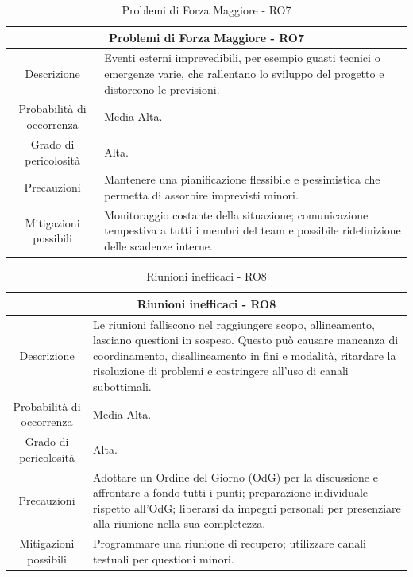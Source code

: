 \documentclass[12pt, a4paper]{article}
\begin{document}
\begin{table}[H]
    \centering
    \renewcommand{\arraystretch}{1.3}
    \begin{tabularx}{\textwidth}{|c|X|}
        \hline
        \multicolumn{2}{|c|}{\textbf{Problemi di Forza Maggiore - RO7}} \\ \hline
        Descrizione & 
        Eventi esterni imprevedibili, per esempio guasti tecnici o emergenze varie, che rallentano lo sviluppo del progetto e distorcono le previsioni.
\\ \hline
        Probabilità di occorrenza & Media-Alta.
\\ \hline
        Grado di pericolosità & Alta.
\\ \hline
        Precauzioni & 
        Mantenere una pianificazione flessibile e pessimistica che permetta di
        assorbire imprevisti minori.
\\ \hline
        Mitigazioni possibili &
        Monitoraggio costante della situazione;
comunicazione tempestiva a tutti
        i membri del team e possibile ridefinizione delle scadenze interne.
\\ \hline
    \end{tabularx}
    \caption{Problemi di Forza Maggiore - RO7}
\end{table}

\begin{table}[H]
    \centering
    \renewcommand{\arraystretch}{1.3}
    \begin{tabularx}{\textwidth}{|c|X|}
        \hline
        \multicolumn{2}{|c|}{\textbf{Riunioni inefficaci - RO8}} \\ \hline
        Descrizione & 
        Le riunioni falliscono nel raggiungere scopo, allineamento, lasciano questioni in sospeso. Questo può causare mancanza di coordinamento, disallineamento in fini e modalità, ritardare la risoluzione di problemi e costringere all'uso di canali subottimali.
        \\ \hline
        Probabilità di occorrenza & Media-Alta.
        \\ \hline
        Grado di pericolosità & Alta.
        \\ \hline
        Precauzioni & 
        Adottare un Ordine del Giorno (OdG) per la discussione e affrontare a fondo tutti i punti; preparazione individuale rispetto all'OdG; liberarsi da impegni personali per presenziare alla riunione nella sua completezza.
        \\ \hline
        Mitigazioni possibili &
        Programmare una riunione di recupero; utilizzare canali testuali per questioni minori.
        \\ \hline
    \end{tabularx}
    \caption{Riunioni inefficaci - RO8}
\end{table}
\end{document}
